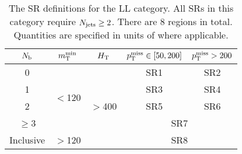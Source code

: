 \begin{table*}[htb!]
    \centering
            \begin{tabular}{|c|c|c|c|c|}
                \hline
                $N_\mathrm{b}$ & $m_{\mathrm{T}}^{\text{min}}$           & $H_{\mathrm{T}}$             & $p_{\mathrm{T}}^\text{miss}\in[50, 200]$ & $p_{\mathrm{T}}^\text{miss}> 200$ \\
                \hline
                0         & \multirow{4}{*}{$<$120} &\multirow{5}{*}{$>$400} & SR1                       & SR2 \\
                \cline{1-1} \cline{4-5}
                1         &                         &                        & SR3                       & SR4 \\
                \cline{1-1} \cline{4-5}
                2         &                         &                        & SR5                       & SR6 \\
                \cline{1-1} \cline{4-5}
                $\geq$3  &                         &                        & \multicolumn{2}{c|}{SR7} \\
                \cline{1-2} \cline{4-5}
                Inclusive & $>$120                  &                        & \multicolumn{2}{c|}{SR8} \\
                \hline
        \end{tabular}
    \caption{\label{tab:SRDefLL} The SR definitions for the LL category.
        All SRs in this category require $N_\text{jets} \geq 2$.
        There are 8 regions in total.
        Quantities are specified in units of \GeV where applicable.}
\end{table*}

